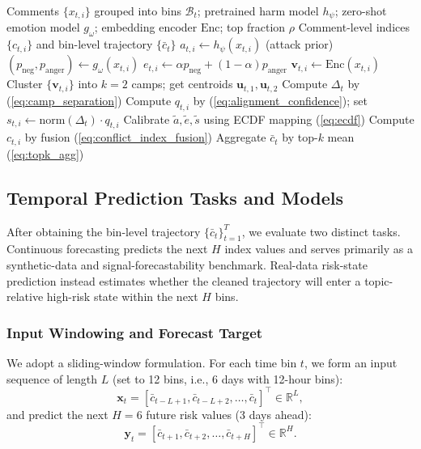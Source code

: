 \documentclass[journal]{IEEEtran}
\begin{document}
\begin{algorithm}[t]
\caption{Unsupervised Conflict Index Computation}\label{alg:conflict_index}
\begin{algorithmic}[1]
\REQUIRE Comments $\{x_{t,i}\}$ grouped into bins $\mathcal{B}_t$; pretrained harm model $h_\psi$; zero-shot emotion model $g_\omega$; embedding encoder $\mathrm{Enc}$; top fraction $\rho$
\ENSURE Comment-level indices $\{c_{t,i}\}$ and bin-level trajectory $\{\bar c_t\}$
    \STATE $a_{t,i}\leftarrow h_\psi(x_{t,i})$ \hfill (attack prior)
    \STATE $(p_{\text{neg}},p_{\text{anger}})\leftarrow g_\omega(x_{t,i})$
    \STATE $e_{t,i}\leftarrow \alpha p_{\text{neg}}+(1-\alpha)p_{\text{anger}}$
    \STATE $\mathbf{v}_{t,i}\leftarrow \mathrm{Enc}(x_{t,i})$
  \ENDFOR
  \STATE Cluster $\{\mathbf{v}_{t,i}\}$ into $k{=}2$ camps; get centroids $\mathbf{u}_{t,1},\mathbf{u}_{t,2}$
  \STATE Compute $\Delta_t$ by (\ref{eq:camp_separation})
    \STATE Compute $q_{t,i}$ by (\ref{eq:alignment_confidence}); set $s_{t,i}\leftarrow \mathrm{norm}(\Delta_t)\cdot q_{t,i}$
  \ENDFOR
\ENDFOR
\STATE Calibrate $\tilde{a},\tilde{e},\tilde{s}$ using ECDF mapping (\ref{eq:ecdf})
  \STATE Compute $c_{t,i}$ by fusion (\ref{eq:conflict_index_fusion})
\ENDFOR
{}
  \STATE Aggregate $\bar c_t$ by top-$k$ mean (\ref{eq:topk_agg})
\ENDFOR
\end{algorithmic}
\end{algorithm}

\subsection{Temporal Prediction Tasks and Models}\label{sec:lstm_forecast}

After obtaining the bin-level trajectory $\{\bar{c}_t\}_{t=1}^{T}$, we evaluate two distinct tasks. Continuous forecasting predicts the next $H$ index values and serves primarily as a synthetic-data and signal-forecastability benchmark. Real-data risk-state prediction instead estimates whether the cleaned trajectory will enter a topic-relative high-risk state within the next $H$ bins.

\subsubsection{Input Windowing and Forecast Target}
We adopt a sliding-window formulation. For each time bin $t$, we form an input sequence of length $L$ (set to 12 bins, i.e., 6 days with 12-hour bins):
\begin{equation}
\mathbf{x}_t = [\bar{c}_{t-L+1},\bar{c}_{t-L+2},\dots,\bar{c}_{t}]^\top \in \mathbb{R}^{L},
\label{eq:lstm_input_window}
\end{equation}
and predict the next $H=6$ future risk values (3 days ahead):
\begin{equation}
\mathbf{y}_t = [\bar{c}_{t+1},\bar{c}_{t+2},\dots,\bar{c}_{t+H}]^\top \in \mathbb{R}^{H}.
\label{eq:lstm_target_window}
\end{equation}
\end{document}

